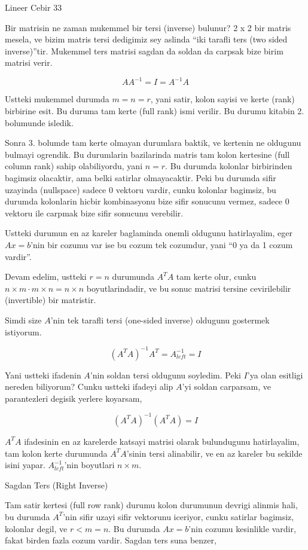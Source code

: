 \documentclass[12pt,fleqn]{article}\usepackage{../common}
\begin{document}
Lineer Cebir 33

Bir matrisin ne zaman mukemmel bir tersi (inverse) bulunur? 2 x 2 bir
matris mesela, ve bizim matris tersi dedigimiz sey aslinda ``iki tarafli
ters (two sided inverse)''tir. Mukemmel ters matrisi sagdan da soldan da
carpsak bize birim matrisi verir. 

$$ A A^{-1} = I = A^{-1}A $$

Ustteki mukemmel durumda $m = n = r$, yani satir, kolon sayisi ve kerte
(rank) birbirine esit. Bu duruma tam kerte (full rank) ismi verilir. Bu
durumu kitabin 2. bolumunde isledik. 

Sonra 3. bolumde tam kerte olmayan durumlara baktik, ve kertenin ne
oldugunu bulmayi ogrendik. Bu durumlarin bazilarinda matris tam kolon
kertesine (full column rank) sahip olabiliyordu, yani $n = r$. Bu durumda
kolonlar birbirinden bagimsiz olacaktir, ama belki satirlar
olmayacaktir. Peki bu durumda sifir uzayinda (nullspace) sadece 0 vektoru
vardir, cunku kolonlar bagimsiz, bu durumda kolonlarin hicbir kombinasyonu
bize sifir sonucunu vermez, sadece 0 vektoru ile carpmak bize sifir
sonucunu verebilir. 

Ustteki durumun en az kareler baglaminda onemli oldugunu hatirlayalim, eger
$Ax = b$'nin bir cozumu var ise bu cozum tek cozumdur, yani ``0 ya da 1
cozum vardir''.

Devam edelim, ustteki $r=n$ durumunda $A^TA$ tam kerte olur, 
cunku $n
\times m \cdot m \times n = n \times n$ boyutlarindadir, ve bu sonuc
matrisi tersine cevirilebilir (invertible) bir matristir.

Simdi size $A$'nin tek tarafli tersi (one-sided inverse) oldugunu gostermek
istiyorum.

$$ (A^TA)^{-1} A^T = A_{left}^{-1} = I$$

Yani ustteki ifadenin $A$'nin soldan tersi oldugunu soyledim. Peki $I$'ya
olan esitligi nereden biliyorum? Cunku ustteki ifadeyi alip $A$'yi soldan
carparsam, ve parantezleri degisik yerlere koyarsam,

$$ (A^TA)^{-1} (A^TA) = I$$

$A^TA$ ifadesinin en az karelerde katsayi matrisi olarak bulundugunu
hatirlayalim, tam kolon kerte durumunda $A^TA$'sinin tersi alinabilir, ve
en az kareler bu sekilde isini yapar.  $A_{left}^{-1}$'nin boyutlari $n \times m$. 

Sagdan Ters (Right Inverse)

Tam satir kertesi (full row rank) durumu kolon durumunun devrigi alinmis
hali, bu durumda $A^T$'nin sifir uzayi sifir vektorunu iceriyor, cunku
satirlar bagimsiz, kolonlar degil, ve $r < m = n$. Bu durumda $Ax = b$'nin
cozumu kesinlikle vardir, fakat birden fazla cozum vardir. Sagdan ters suna
benzer, 
\end{document}

